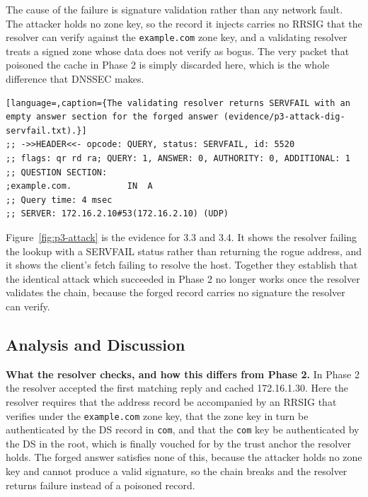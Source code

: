 \documentclass[11pt]{article}
\begin{document}
The cause of the failure is signature validation rather than any network fault. The
attacker holds no zone key, so the record it injects carries no RRSIG that the
resolver can verify against the \texttt{example.com} zone key, and a validating
resolver treats a signed zone whose data does not verify as bogus. The very packet
that poisoned the cache in Phase 2 is simply discarded here, which is the whole
difference that DNSSEC makes.

\begin{lstlisting}[language=,caption={The validating resolver returns SERVFAIL with an empty answer section for the forged answer (evidence/p3-attack-dig-servfail.txt).}]
;; ->>HEADER<<- opcode: QUERY, status: SERVFAIL, id: 5520
;; flags: qr rd ra; QUERY: 1, ANSWER: 0, AUTHORITY: 0, ADDITIONAL: 1
;; QUESTION SECTION:
;example.com.			IN	A
;; Query time: 4 msec
;; SERVER: 172.16.2.10#53(172.16.2.10) (UDP)
\end{lstlisting}


Figure~\ref{fig:p3-attack} is the evidence for 3.3 and 3.4. It
shows the resolver failing the lookup with a SERVFAIL status rather than
returning the rogue address, and it shows the client's fetch failing to
resolve the host. Together they establish that the identical attack which succeeded
in Phase 2 no longer works once the resolver validates the chain, because the
forged record carries no signature the resolver can verify.

\subsection{Analysis and Discussion}

\textbf{What the resolver checks, and how this differs from Phase 2.} In Phase 2
the resolver accepted the first matching reply and cached 172.16.1.30. Here the
resolver requires that the address record be accompanied by an RRSIG that verifies
under the \texttt{example.com} zone key, that the zone key in turn be authenticated
by the DS record in \texttt{com}, and that the \texttt{com} key be authenticated by
the DS in the root, which is finally vouched for by the trust anchor the resolver
holds. The forged answer satisfies none of this, because the attacker holds no zone
key and cannot produce a valid signature, so the chain breaks and the resolver
returns failure instead of a poisoned record.
\end{document}
